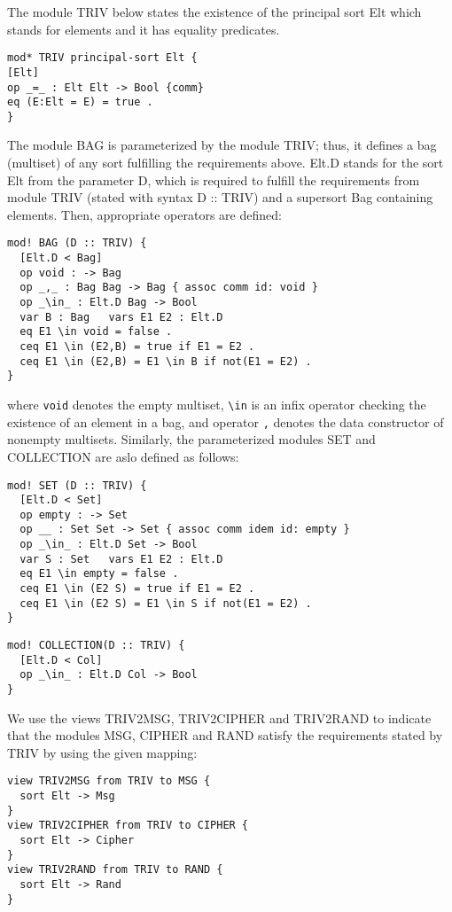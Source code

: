 \documentclass[a4paper,fleqn]{cas-dc}
\begin{document}
The module TRIV below states the existence of the principal sort Elt which
stands for elements and it has equality predicates.
\begin{small}
\begin{verbatim}
mod* TRIV principal-sort Elt {
[Elt]
op _=_ : Elt Elt -> Bool {comm}
eq (E:Elt = E) = true .
}
\end{verbatim}
\end{small}
The module BAG is parameterized by the module TRIV; thus, it defines a bag (multiset) of any sort fulfilling the requirements above. Elt.D stands for the sort Elt from the parameter D, which is required to fulfill the requirements from module TRIV (stated with syntax D :: TRIV) and a supersort Bag containing elements. Then, appropriate operators are defined:
\begin{small}
\begin{verbatim}
mod! BAG (D :: TRIV) {
  [Elt.D < Bag]
  op void : -> Bag
  op _,_ : Bag Bag -> Bag { assoc comm id: void }
  op _\in_ : Elt.D Bag -> Bool
  var B : Bag   vars E1 E2 : Elt.D
  eq E1 \in void = false .
  ceq E1 \in (E2,B) = true if E1 = E2 .
  ceq E1 \in (E2,B) = E1 \in B if not(E1 = E2) .
}
\end{verbatim}
\end{small}
where \verb!void! denotes the empty multiset, \verb!\in! is an infix operator checking the existence of an element in a bag, and operator \verb!,! denotes the data constructor of nonempty multisets. Similarly, the parameterized modules SET and COLLECTION are aslo defined as follows:
\begin{small}
\begin{verbatim}
mod! SET (D :: TRIV) {
  [Elt.D < Set]
  op empty : -> Set
  op __ : Set Set -> Set { assoc comm idem id: empty }
  op _\in_ : Elt.D Set -> Bool
  var S : Set   vars E1 E2 : Elt.D
  eq E1 \in empty = false .
  ceq E1 \in (E2 S) = true if E1 = E2 .
  ceq E1 \in (E2 S) = E1 \in S if not(E1 = E2) .
}
\end{verbatim}
\end{small}
\begin{small}
\begin{verbatim}
mod! COLLECTION(D :: TRIV) {
  [Elt.D < Col]
  op _\in_ : Elt.D Col -> Bool
}
\end{verbatim}
\end{small}

We use the views TRIV2MSG, TRIV2CIPHER and TRIV2RAND to indicate that the modules MSG, CIPHER and RAND satisfy the requirements stated by TRIV by using the given mapping:
\begin{small}
\begin{verbatim}
view TRIV2MSG from TRIV to MSG {
  sort Elt -> Msg
}
view TRIV2CIPHER from TRIV to CIPHER {
  sort Elt -> Cipher
}
view TRIV2RAND from TRIV to RAND {
  sort Elt -> Rand
}
\end{verbatim}
\end{small}
\end{document}
